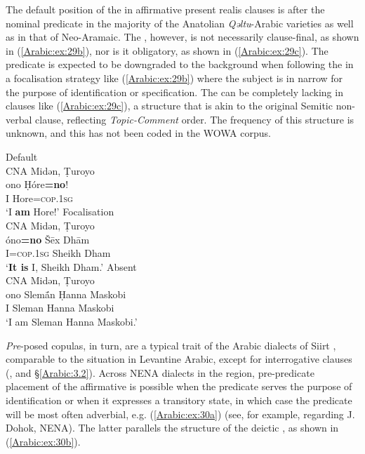 \documentclass[output=paper,colorlinks,citecolor=brown,draftmode]{langscibook}
\begin{document}
The default position of the  in affirmative present realis clauses is after the nominal predicate in the majority of the Anatolian \textit{Qəltu}-Arabic varieties as well as in that of Neo-Aramaic. The , however, is not necessarily clause-final, as shown in (\ref{Arabic:ex:29b}), nor is it obligatory, as shown in (\ref{Arabic:ex:29c}). The predicate is expected to be downgraded to the background when following the  in a focalisation strategy like (\ref{Arabic:ex:29b}) where the subject  is in narrow  for the purpose of identification or specification. The  can be completely lacking in clauses like (\ref{Arabic:ex:29c}), a structure that is akin to the original Semitic non-verbal clause, reflecting \textit{Topic-Comment} order. The frequency of this structure is unknown, and this has not been coded in the WOWA corpus.

\ea
\ea\label{Arabic:ex:29a}
Default\\
CNA Midən, Ṭuroyo \citep[79:§12]{Ritter1967Turoyo} \\
\gll ono Ḥóre\textbf{=no}! \\
I Hore\textsc{=cop.1sg} \\
\glt `I \textbf{am} Hore!'
\ex\label{Arabic:ex:29b}
Focalisation\\
CNA Midən, Ṭuroyo \citep[82:§40]{Ritter1967Turoyo} \\
\gll óno\textbf{=no} Šēx Dhām \\
I\textsc{=cop.1sg} Sheikh Dham \\
\glt `\textbf{It is} I, Sheikh Dham.' 
\ex\label{Arabic:ex:29c}
Absent\\
CNA Midən, Ṭuroyo \citep[116:§1]{Ritter1967Turoyo} \\
\gll ono Slemā́n Ḥanna Maskobi \\
I Sleman Hanna Maskobi \\
\glt `I am Sleman Hanna Maskobi.'
\z
\z

\textit{Pre}-posed copulas, in turn, are a typical trait of the Arabic dialects of Siirt \citep{Lahdo2009ATillo}, comparable to the situation in Levantine Arabic, except for interrogative clauses (\citealt[132]{Jastrow1978MAqetlu1}, and §\ref{Arabic:3.2}). Across NENA dialects in the region, pre-predicate placement of the affirmative  is possible when the predicate serves the purpose of identification or when it expresses a transitory state, in which case the predicate will be most often adverbial, e.g. (\ref{Arabic:ex:30a}) (see, for example, \citealt[219--262]{Molin2022NEDohok} regarding J. Dohok, NENA). The latter parallels the structure of the deictic , as shown in (\ref{Arabic:ex:30b}).
\end{document}
